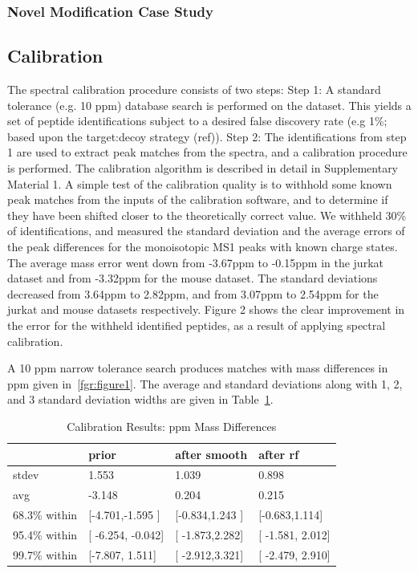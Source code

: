 \documentclass[journal=jprobs,manuscript=article]{achemso}
\begin{document}
 
\subsubsection{Novel Modification Case Study}


\subsection{Calibration}

The spectral calibration procedure consists of two steps: Step 1: A standard tolerance (e.g. 10 ppm) database search is performed on the dataset. This yields a set of peptide identifications subject to a desired false discovery rate (e.g 1\%; based upon the target:decoy strategy (ref)).  Step 2:  The identifications from step 1 are used to extract peak matches from the spectra, and a calibration procedure is performed. The calibration algorithm is described in detail in Supplementary Material 1.
A simple test of the calibration quality is to withhold some known peak matches from the inputs of the calibration software, and to determine if they have been shifted closer to the theoretically correct value. We withheld 30\% of identifications, and measured the standard deviation and the average errors of the peak differences for the monoisotopic MS1 peaks with known charge states. The average mass error went down from -3.67ppm to -0.15ppm in the jurkat dataset and from -3.32ppm for the mouse dataset. The standard deviations decreased from 3.64ppm to 2.82ppm, and from 3.07ppm to 2.54ppm for the jurkat and mouse datasets respectively. Figure 2 shows the clear improvement in the error for the withheld identified peptides, as a result of applying spectral calibration.

A 10 ppm narrow tolerance search produces matches with mass differences in ppm given in~\ref{fgr:figure1}. The average and standard deviations along with 1, 2, and 3 standard deviation widths are given in Table~\ref{tbl:calib}.

\begin{table}
  \caption{Calibration Results: ppm Mass Differences}
  \label{tbl:calib}
  \begin{tabular}{llll}
    \hline
    & prior& after smooth & after rf  \\
    \hline
    stdev&	1.553	&1.039&	0.898 \\
	avg&	-3.148&	0.204&0.215\\
	68.3\% within	& [-4.701,-1.595 ]&	[-0.834,1.243	]&	[-0.683,1.114]\\
	95.4\% within&[	-6.254,	-0.042]&[	-1.873,2.282]&[	-1.581,	2.012]\\
	99.7\% within&	[-7.807,	1.511]&[	-2.912,3.321]&[	-2.479,	2.910]\\
    \hline
  \end{tabular}
\end{table}
\end{document}
